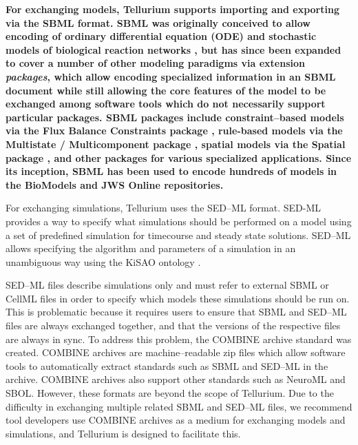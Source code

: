 \documentclass[10pt,letterpaper]{article}
\begin{document}
{ \bf
For exchanging models, Tellurium supports importing and exporting via the SBML format. SBML was originally conceived to allow encoding of ordinary differential equation (ODE) and stochastic models of biological reaction networks \cite{hucka2003systems}, but has since been expanded to cover a number of other modeling paradigms via extension \textit{packages}, which allow encoding specialized information in an SBML document while still allowing the core features of the model to be exchanged among software tools which do not necessarily support particular packages. SBML packages include constraint--based models via the Flux Balance Constraints package \cite{sbmlfbc}, rule-based models via the Multistate / Multicomponent package \cite{sbmlmulti}, spatial models via the Spatial package \cite{sbmlspatial}, and other packages for various specialized applications. Since its inception, SBML has been used to encode hundreds of models in the BioModels \cite{le2006biomodels,li2010biomodels} and JWS Online \cite{olivier2004web} repositories.

For exchanging simulations, Tellurium uses the SED--ML format. SED-ML provides a way to specify what simulations should be performed on a model using a set of predefined simulation for timecourse and steady state solutions. SED--ML allows specifying the algorithm and parameters of a simulation in an unambiguous way using the KiSAO ontology \cite{courtot2011controlled}.

SED--ML files describe simulations only and must refer to external SBML or CellML files in order to specify which models these simulations should be run on. This is problematic because it requires users to ensure that SBML and SED--ML files are always exchanged together, and that the versions of the respective files are always in sync. To address this problem, the COMBINE archive standard was created. COMBINE archives are machine--readable zip files which allow software tools to automatically extract standards such as SBML and SED--ML in the archive. COMBINE archives also support other standards such as NeuroML and SBOL. However, these formats are beyond the scope of Tellurium. Due to the difficulty in exchanging multiple related SBML and SED--ML files, we recommend tool developers use COMBINE archives as a medium for exchanging models and simulations, and Tellurium is designed to facilitate this.
}
\end{document}
